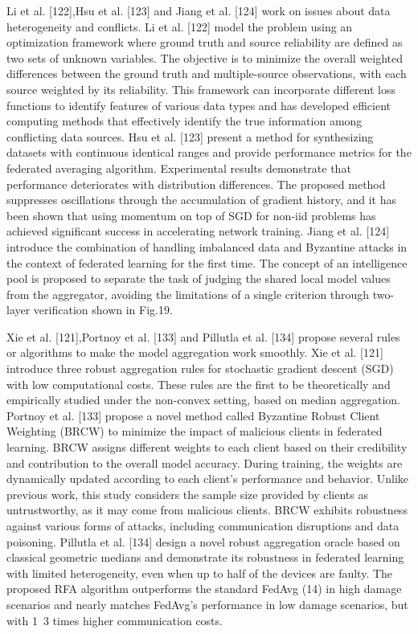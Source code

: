 Li et al. [122],Hsu et al. [123] and Jiang et al. [124]
work on issues about data heterogeneity and conflicts.
Li et al. [122] model the problem using an optimization
framework where ground truth and source reliability are
defined as two sets of unknown variables. The objective
is to minimize the overall weighted differences between
the ground truth and multiple-source observations, with
each source weighted by its reliability. This framework
can incorporate different loss functions to identify
features of various data types and has developed eﬀicient
computing methods that effectively identify the true
information among conflicting data sources. Hsu et al.
[123] present a method for synthesizing datasets with
continuous identical ranges and provide performance
metrics for the federated averaging algorithm. Experimental
results demonstrate that performance deteriorates with
distribution differences. The proposed method suppresses
oscillations through the accumulation of gradient history,
and it has been shown that using momentum on top
of SGD for non-iid problems has achieved significant
success in accelerating network training. Jiang et al. [124]
introduce the combination of handling imbalanced data
and Byzantine attacks in the context of federated learning
for the first time. The concept of an intelligence pool is
proposed to separate the task of judging the shared local
model values from the aggregator, avoiding the limitations
of a single criterion through two-layer verification shown
in Fig.19.

Xie et al. [121],Portnoy et al. [133] and Pillutla et
al. [134] propose several rules or algorithms to make
the model aggregation work smoothly. Xie et al. [121]
introduce three robust aggregation rules for stochastic
gradient descent (SGD) with low computational costs.
These rules are the first to be theoretically and empirically
studied under the non-convex setting, based on median
aggregation. Portnoy et al. [133] propose a novel method
called Byzantine Robust Client Weighting (BRCW) to
minimize the impact of malicious clients in federated
learning. BRCW assigns different weights to each client
based on their credibility and contribution to the overall
model accuracy. During training, the weights are
dynamically updated according to each client's performance
and behavior. Unlike previous work, this study considers
the sample size provided by clients as untrustworthy,
as it may come from malicious clients. BRCW exhibits
robustness against various forms of attacks, including
communication disruptions and data poisoning. Pillutla
et al. [134] design a novel robust aggregation oracle based
on classical geometric medians and demonstrate its
robustness in federated learning with limited heterogeneity, even
when up to half of the devices are faulty. The proposed
RFA algorithm outperforms the standard FedAvg (14)
in high damage scenarios and nearly matches FedAvg's
performance in low damage scenarios, but with 1~3 times
higher communication costs. 

